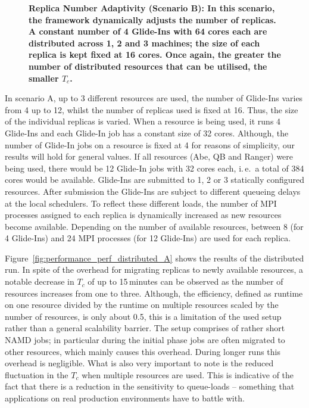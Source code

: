 \documentclass{rspublic}
\begin{document}
\begin{figure}[h]
\begin{minipage}[t]{.485\textwidth}
\begin{center}
      \caption{\footnotesize \bf Replica Number Adaptivity (Scenario
        B): In this scenario, the framework dynamically adjusts the
        number of replicas.  A constant number of 4 Glide-Ins with 64
        cores each are distributed across 1, 2 and 3 machines; the
        size of each replica is kept fixed at 16 cores. Once again,
        the greater the number of distributed resources that can be
        utilised, the smaller $T_{c}$.}
      \label{fig:performance_perf_distributed_B}
    \end{center}
  \end{minipage}
  \hfill
\end{figure}

In scenario A, up to 3 different resources are used, the number of
Glide-Ins varies from 4 up to 12, whilst the number of replicas used is
fixed at 16. Thus, the size of the individual replicas is varied.
When a resource is being used, it runs 4 Glide-Ins and each Glide-In
job has a constant size of 32 cores.  Although, the number of
Glide-In jobs on a resource is fixed at 4 for reasons of simplicity,
our results will hold for general values. If all
resources (Abe, QB and Ranger) were being used, there would be 12
Glide-In jobs with 32 cores each, i.\,e.\ a total of 384 cores would 
be available.  Glide-Ins
are submitted to 1, 2 or 3 statically configured resources. After submission
the Glide-Ins are subject to different queueing delays at the local
schedulers. To reflect these different loads, the number of
MPI processes assigned to each replica is dynamically
increased as new resources become available.
Depending on the number of available
resources, between 8 (for 4 Glide-Ins) and 24 MPI processes (for 12 Glide-Ins)
are used for each replica.

Figure~\ref{fig:performance_perf_distributed_A} shows the results of
the distributed run. In spite of the overhead for migrating replicas
to newly available resources, a notable decrease in $T_c$ of up to
15\,minutes can be observed as the number of resources increases from
one to three. Although, the efficiency, defined as runtime on one
resource divided by the runtime on multiple resources scaled by the
number of resources, is only about 0.5, this is a limitation of the
used setup rather than a general scalability barrier.  The setup
comprises of rather short NAMD jobs; in particular during the initial
phase jobs are often migrated to other resources, which mainly causes
this overhead. During longer runs this overhead is 
negligible. What is also very important to note is the reduced
fluctuation in the $T_c$ when multiple resources are used. This is
indicative of the fact that there is a reduction in the sensitivity to
queue-loads -- something that applications on real production
environments have to battle with.  
\end{document}
